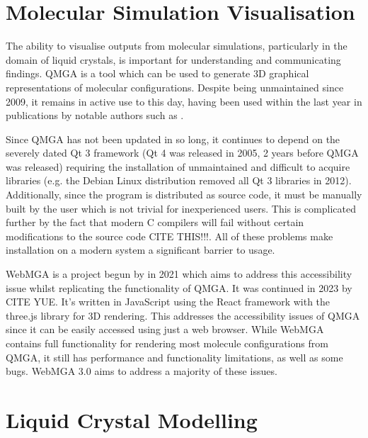\section{Molecular Simulation Visualisation}
The ability to visualise outputs from molecular simulations, particularly in the domain of liquid crystals, is important for understanding and communicating findings. QMGA\cite{gabriel2008molecular} is a tool which can be used to generate 3D graphical representations of molecular configurations. Despite being unmaintained since 2009\cite{qmga_release}, it remains in active use to this day, having been used within the last year in publications by notable authors such as \textcite{ramirez2023densest,mazzilli2023phase}.

Since QMGA has not been updated in so long, it continues to depend on the severely dated Qt 3 framework (Qt 4 was released in 2005, 2 years before QMGA was released) requiring the installation of unmaintained and difficult to acquire libraries (e.g. the Debian Linux distribution removed all Qt 3 libraries in 2012\cite{qt3_removed}). Additionally, since the program is distributed as source code, it must be manually built by the user which is not trivial for inexperienced users. This is complicated further by the fact that modern C compilers will fail without certain modifications to the source code CITE THIS!!!. All of these problems make installation on a modern system a significant barrier to usage.

WebMGA is a project begun by \textcite{Battistini_2021} in 2021 which aims to address this accessibility issue whilst replicating the functionality of QMGA. It was continued in 2023 by CITE YUE. It's written in JavaScript using the React framework with the three.js library for 3D rendering. This addresses the accessibility issues of QMGA since it can be easily accessed using just a web browser. While WebMGA contains full functionality for rendering most molecule configurations from QMGA, it still has performance and functionality limitations, as well as some bugs. WebMGA 3.0 aims to address a majority of these issues.

\section{Liquid Crystal Modelling}
